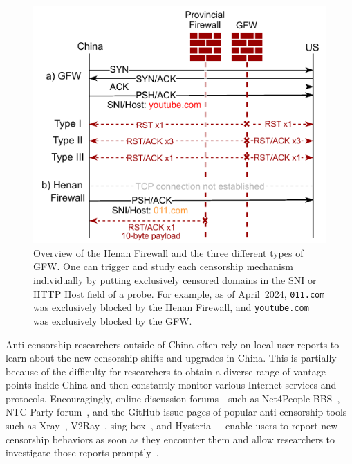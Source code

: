 \documentclass[conference,compsoc]{IEEEtran}
\begin{document}
\begin{figure}[t!]
  \centering
  \includegraphics[width=\columnwidth]{figures/waterfall-diag.pdf}
  \caption{
    Overview of the Henan Firewall and the three different types of GFW.
    One can trigger and study each censorship mechanism individually
    by putting exclusively censored domains in the SNI or HTTP Host field of a probe.
    For example,
    as of April~2024,
    \texttt{011.com} was exclusively blocked by the Henan Firewall,
    and \texttt{youtube.com} was exclusively blocked by the GFW.
  }
  \label{fig:waterfall-diag}
\end{figure}

Anti-censorship researchers outside of China often rely on local user reports
to learn about the new censorship shifts and upgrades in China.
This is partially because of the difficulty for researchers to
obtain a diverse range of vantage points inside China
and then constantly monitor various Internet services and protocols.
Encouragingly,
online discussion forums---such as
Net4People BBS~\cite{net4people_bbs_issues},
NTC Party forum~\cite{ntc_party_forum}, and
the GitHub issue pages of popular anti-censorship tools
such as Xray~\cite{xtls_xray_core_issues}, V2Ray~\cite{v2fly_v2ray_core_issues}, sing-box~\cite{sagernet_sing_box_issues},
and Hysteria~\cite{apernet_hysteria_issues}---enable users to report new censorship
behaviors as soon as they encounter
them and allow researchers to investigate those reports promptly~\cite{cat-and-mouse}.
\end{document}
